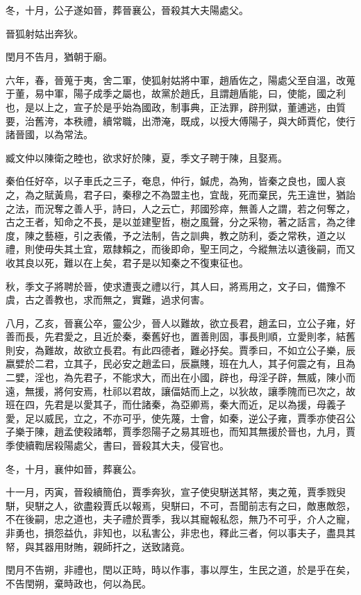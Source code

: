 \begin{pinyinscope}
冬，十月，公子遂如晉，葬晉襄公，晉殺其大夫陽處父。

晉狐射姑出奔狄。

閏月不告月，猶朝于廟。

六年，春，晉蒐于夷，舍二軍，使狐射姑將中軍，趙盾佐之，陽處父至自溫，改蒐于董，易中軍，陽子成季之屬也，故黨於趙氏，且謂趙盾能，曰，使能，國之利也，是以上之，宣子於是乎始為國政，制事典，正法罪，辟刑獄，董逋逃，由質要，治舊洿，本秩禮，續常職，出滯淹，既成，以授大傅陽子，與大師賈佗，使行諸晉國，以為常法。

臧文仲以陳衛之睦也，欲求好於陳，夏，季文子聘于陳，且娶焉。

秦伯任好卒，以子車氏之三子，奄息，仲行，鍼虎，為殉，皆秦之良也，國人哀之，為之賦黃鳥，君子曰，秦穆之不為盟主也，宜哉，死而棄民，先王違世，猶詒之法，而況奪之善人乎，詩曰，人之云亡，邦國殄瘁，無善人之謂，若之何奪之，古之王者，知命之不長，是以並建聖哲，樹之風聲，分之采物，著之話言，為之律度，陳之藝極，引之表儀，予之法制，告之訓典，教之防利，委之常秩，道之以禮，則使毋失其土宜，眾隸賴之，而後即命，聖王同之，今縱無法以遺後嗣，而又收其良以死，難以在上矣，君子是以知秦之不復東征也。

秋，季文子將聘於晉，使求遭喪之禮以行，其人曰，將焉用之，文子曰，備豫不虞，古之善教也，求而無之，實難，過求何害。

八月，乙亥，晉襄公卒，靈公少，晉人以難故，欲立長君，趙孟曰，立公子雍，好善而長，先君愛之，且近於秦，秦舊好也，置善則固，事長則順，立愛則孝，結舊則安，為難故，故欲立長君。有此四德者，難必抒矣。賈季曰，不如立公子樂，辰嬴嬖於二君，立其子，民必安之趙孟曰，辰嬴賤，班在九人，其子何震之有，且為二嬖，淫也，為先君子，不能求大，而出在小國，辟也，母淫子辟，無威，陳小而遠，無援，將何安焉，杜祁以君故，讓偪姞而上之，以狄故，讓季隗而已次之，故班在四，先君是以愛其子，而仕諸秦，為亞卿焉，秦大而近，足以為援，母義子愛，足以威民，立之，不亦可乎，使先蔑，士會，如秦，逆公子雍，賈季亦使召公子樂于陳，趙孟使殺諸郫，賈季怨陽子之易其班也，而知其無援於晉也，九月，賈季使續鞫居殺陽處父，書曰，晉殺其大夫，侵官也。

冬，十月，襄仲如晉，葬襄公。

十一月，丙寅，晉殺續簡伯，賈季奔狄，宣子使臾駢送其帑，夷之蒐，賈季戮臾駢，臾駢之人，欲盡殺賈氏以報焉，臾駢曰，不可，吾聞前志有之曰，敵惠敵怨，不在後嗣，忠之道也，夫子禮於賈季，我以其寵報私怨，無乃不可乎，介人之寵，非勇也，損怨益仇，非知也，以私害公，非忠也，釋此三者，何以事夫子，盡具其帑，與其器用財賄，親師扞之，送致諸竟。

閏月不告朔，非禮也，閏以正時，時以作事，事以厚生，生民之道，於是乎在矣，不告閏朔，棄時政也，何以為民。


\end{pinyinscope}
